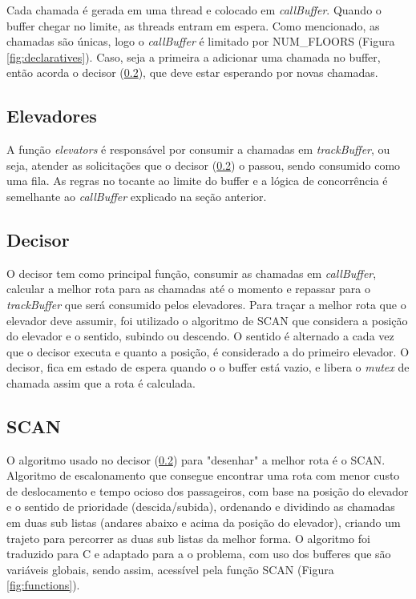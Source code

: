 \documentclass[a4paper,final,12pt]{article}
\begin{document}
Cada chamada é gerada em uma thread e colocado em \textit{callBuffer}. Quando o buffer chegar no limite, as threads entram em espera. Como mencionado, as chamadas são únicas, logo o \textit{callBuffer} é limitado por NUM\_FLOORS (Figura \ref{fig:declaratives}). Caso, seja a primeira a adicionar uma chamada no buffer, então acorda o decisor (\ref{subsection:decider}), que deve estar esperando por novas chamadas.

\subsection{Elevadores}\label{subsection:elevators}
A função \textit{elevators} é responsável por consumir a chamadas em \textit{trackBuffer}, ou seja, atender as solicitações que o decisor (\ref{subsection:decider}) o passou, sendo consumido como uma fila. As regras no tocante ao limite do buffer e a lógica de concorrência é semelhante ao \textit{callBuffer} explicado na seção anterior.

\subsection{Decisor}\label{subsection:decider} 
O decisor tem como principal função, consumir as chamadas em \textit{callBuffer}, calcular a melhor rota para as chamadas até o momento e repassar para o \textit{trackBuffer} que será consumido pelos elevadores. Para traçar a melhor rota que o elevador deve assumir, foi utilizado o algoritmo de SCAN \cite{scan} que considera a posição do elevador e o sentido, subindo ou descendo. O sentido é alternado a cada vez que o decisor executa e quanto a posição, é considerado a do primeiro elevador. O decisor, fica em estado de espera quando o o buffer está vazio, e libera o \textit{mutex} de chamada assim que a rota é calculada.

\subsection{SCAN}\label{subsection:scan}
O algoritmo usado no decisor (\ref{subsection:decider}) para "desenhar" a melhor rota é o SCAN. Algoritmo de escalonamento que consegue encontrar uma rota com menor custo de deslocamento e tempo ocioso dos passageiros, com base na posição do elevador e o sentido de prioridade (descida/subida), ordenando e dividindo as chamadas em duas sub listas (andares abaixo e acima da posição do elevador), criando um trajeto para percorrer as duas sub listas da melhor forma. O algoritmo foi traduzido para C e adaptado para a o problema, com uso dos bufferes que são variáveis globais, sendo assim, acessível pela função SCAN (Figura \ref{fig:functions}).
\end{document}
